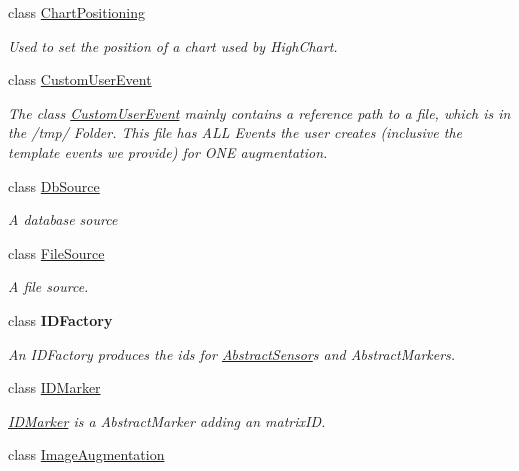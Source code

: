 \begin{DoxyCompactItemize}
class \hyperlink{class_a_rdev_kit_1_1_model_1_1_project_1_1_chart_positioning}{Chart\-Positioning}
\begin{DoxyCompactList}\small\item\em Used to set the position of a chart used by High\-Chart. \end{DoxyCompactList}\item 
class \hyperlink{class_a_rdev_kit_1_1_model_1_1_project_1_1_custom_user_event}{Custom\-User\-Event}
\begin{DoxyCompactList}\small\item\em The class \hyperlink{class_a_rdev_kit_1_1_model_1_1_project_1_1_custom_user_event}{Custom\-User\-Event} mainly contains a reference path to a file, which is in the /tmp/ Folder. This file has A\-L\-L Events the user creates (inclusive the template events we provide) for O\-N\-E augmentation. \end{DoxyCompactList}\item 
class \hyperlink{class_a_rdev_kit_1_1_model_1_1_project_1_1_db_source}{Db\-Source}
\begin{DoxyCompactList}\small\item\em A database source \end{DoxyCompactList}\item 
class \hyperlink{class_a_rdev_kit_1_1_model_1_1_project_1_1_file_source}{File\-Source}
\begin{DoxyCompactList}\small\item\em A file source. \end{DoxyCompactList}\item 
class {\bfseries I\-D\-Factory}
\begin{DoxyCompactList}\small\item\em An I\-D\-Factory produces the ids for \hyperlink{class_a_rdev_kit_1_1_model_1_1_project_1_1_abstract_sensor}{Abstract\-Sensor}s and Abstract\-Markers. \end{DoxyCompactList}\item 
class \hyperlink{class_a_rdev_kit_1_1_model_1_1_project_1_1_i_d_marker}{I\-D\-Marker}
\begin{DoxyCompactList}\small\item\em \hyperlink{class_a_rdev_kit_1_1_model_1_1_project_1_1_i_d_marker}{I\-D\-Marker} is a Abstract\-Marker adding an matrix\-I\-D. \end{DoxyCompactList}\item 
class \hyperlink{class_a_rdev_kit_1_1_model_1_1_project_1_1_image_augmentation}{Image\-Augmentation}

\end{DoxyCompactItemize}
